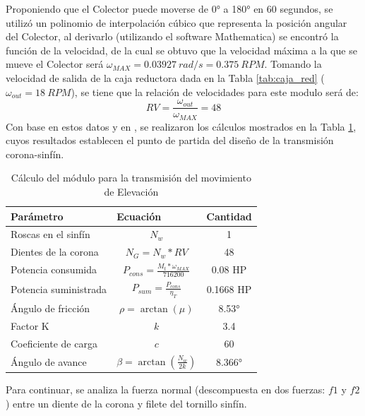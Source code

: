 Proponiendo que el Colector puede moverse de 0° a 180° en 60 segundos, se utilizó un polinomio de interpolación cúbico que representa la posición angular del Colector, al derivarlo (utilizando el software Mathematica) se encontró la función de la velocidad, de la cual se obtuvo que la velocidad máxima a la que se mueve el Colector será $ \omega_{MAX}=0.03927\ rad/s=0.375\ RPM $. Tomando la velocidad de salida de la caja reductora dada en la Tabla \ref{tab:caja_red} ($ \omega_{out}=18\ RPM $), se tiene que la relación de velocidades para este modulo será de:
\begin{equation}
    RV = \frac{\omega_{out}}{\omega_{MAX}} = 48
\end{equation}
Con base en estos datos y en \cite{DDA10}, se realizaron los cálculos mostrados en la Tabla \ref{tab:modele}, cuyos resultados establecen el punto de partida del diseño de la transmisión corona-sinfín.
\begin{table}[H]
	\centering
	\caption{Cálculo del módulo para la transmisión del movimiento de Elevación}
	\begin{tabular}{|l|c|c|}
		\hline
		\textbf{Parámetro} & \multicolumn{1}{l|}{\textbf{Ecuación}} & \multicolumn{1}{l|}{\textbf{Cantidad}} \\
		\hline \hline
		Roscas en el sinfín & $ N_w $ & 1 \\
		\hline
		Dientes de la corona & $ N_G = N_w * RV $ & 48 \\
		\hline
		Potencia consumida & $ P_{cons}=\frac{M_t*\omega_{MAX}}{716200} $ & 0.08 HP \\
		\hline
		Potencia suministrada & $ P_{sum}=\frac{P_{cons}}{\eta_T} $ & 0.1668 HP \\
		\hline
		Ángulo de fricción & $ \rho=\arctan(\mu) $ & 8.53° \\
		\hline
		Factor K & $ k $ & 3.4 \\
		\hline
		Coeficiente de carga & $ c $ & 60 \\
		\hline
		Ángulo de avance  & $\beta=\arctan(\frac{N_w}{2k})$ & 8.366° \\
		\hline
	\end{tabular}%
	\label{tab:modele}%
\end{table}%

Para continuar, se analiza la fuerza normal (descompuesta en dos fuerzas: $ f1 $ y $ f2 $) entre un diente de la corona y filete del tornillo sinfín.

